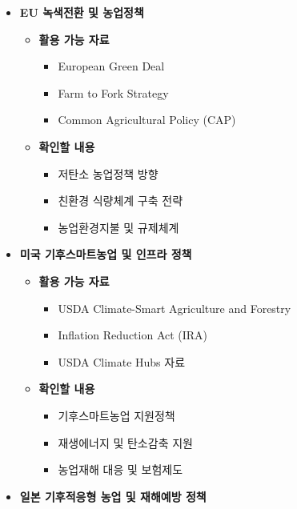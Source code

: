 \begin{itemize}

    \item \textbf{EU 녹색전환 및 농업정책}

    \begin{itemize}
        \item \textbf{활용 가능 자료}
        \begin{itemize}
            \item European Green Deal
            \item Farm to Fork Strategy
            \item Common Agricultural Policy (CAP)
        \end{itemize}

        \item \textbf{확인할 내용}
        \begin{itemize}
            \item 저탄소 농업정책 방향
            \item 친환경 식량체계 구축 전략
            \item 농업환경지불 및 규제체계
        \end{itemize}
    \end{itemize}

    \item \textbf{미국 기후스마트농업 및 인프라 정책}

    \begin{itemize}
        \item \textbf{활용 가능 자료}
        \begin{itemize}
            \item USDA Climate-Smart Agriculture and Forestry
            \item Inflation Reduction Act (IRA)
            \item USDA Climate Hubs 자료
        \end{itemize}

        \item \textbf{확인할 내용}
        \begin{itemize}
            \item 기후스마트농업 지원정책
            \item 재생에너지 및 탄소감축 지원
            \item 농업재해 대응 및 보험제도
        \end{itemize}
    \end{itemize}

    \item \textbf{일본 기후적응형 농업 및 재해예방 정책}


\end{itemize}
